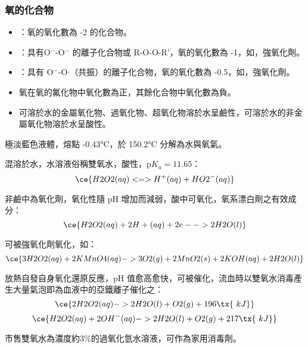 \documentclass[a4paper,12pt]{report}
\begin{document}
\subsubsection{氧的化合物}
\begin{itemize}
\item {}：氧的氧化數為 -2 的化合物。
\item {}：具有O$^-$-O$^-$ 的離子化合物或 R-O-O-R'，氧的氧化數為 -1，如，強氧化劑。
\item {}：具有 O$^-$-O$\cdot$（共振）的離子化合物，氧的氧化數為 -0.5，如，強氧化劑。
\item 氧在氧的氟化物中氧化數為正，其餘化合物中氧化數為負。
\item 可溶於水的金屬氧化物、過氧化物、超氧化物溶於水呈鹼性，可溶於水的非金屬氧化物溶於水呈酸性。
\end{itemize}
\bit
\item 極淡藍色液體，熔點 -0.43°C，於 150.2°C 分解為水與氧氣。
\item 混溶於水，水溶液俗稱雙氧水，酸性，p$K_a=11.65$：
\[\ce{H2O2(aq) <=> H^+(aq) + HO2^-(aq)}\]
\item 非鹼中為氧化劑，氧化性隨 pH 增加而減弱，酸中可氧化，氧系漂白劑之有效成分：
\[\ce{H2O2(aq) + 2H+(aq) + 2e- -> 2H2O(l)}\]
\item 可被強氧化劑氧化，如：
\[\ce{3H2O2(aq) + 2KMnO4(aq) -> 3O2(g) + 2MnO2(s) + 2KOH(aq) + 2H2O(l)}\]
\item 放熱自發自身氧化還原反應，pH 值愈高愈快，可被催化，流血時以雙氧水消毒產生大量氣泡即為血液中的亞鐵離子催化之：
\[\ce{2H2O2(aq) -> 2H2O(l) + O2(g) + 196\tx{\ kJ}}\]
\[\ce{H2O2(aq) + 2OH^-(aq) -> 2H2O(l) + O2(g) + 217\tx{\ kJ}}\]
\item 市售雙氧水為濃度約3\%的過氧化氫水溶液，可作為家用消毒劑。
\eit
{}
\end{document}
